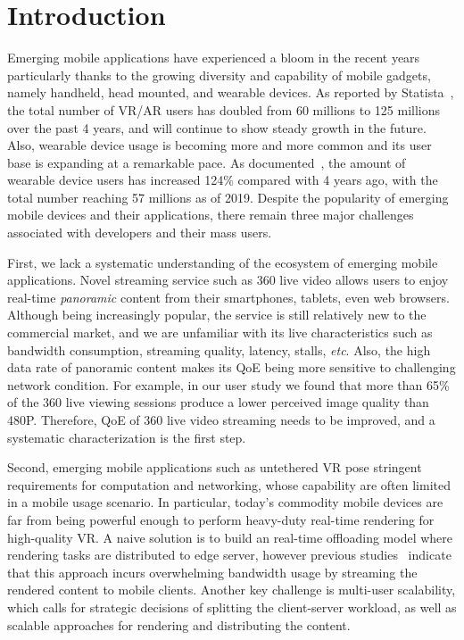 \chapter{Introduction} \label{chap:intro}

Emerging mobile applications have experienced a bloom in the recent years particularly thanks to the growing diversity and capability of mobile gadgets, namely handheld, head mounted, and wearable devices. As reported by Statista~\cite{VRARusers}, the total number of VR/AR users has doubled from 60 millions to 125 millions over the past 4 years, and will continue to show steady growth in the future. Also, wearable device usage is becoming more and more common and its user base is expanding at a remarkable pace. As documented~\cite{wearableusers}, the amount of wearable device users has increased 124\% compared with 4 years ago, with the total number reaching 57 millions as of 2019. Despite the popularity of emerging mobile devices and their applications, there remain three major challenges associated with developers and their mass users.

First, we lack a systematic understanding of the ecosystem of emerging mobile applications. Novel streaming service such as 360\degree{} live video allows users to enjoy real-time \emph{panoramic} content from their smartphones, tablets, even web browsers. Although being increasingly popular, the service is still relatively new to the commercial market, and we are unfamiliar with its live characteristics such as bandwidth consumption, streaming quality, latency, stalls, \emph{etc}. Also, the high data rate of panoramic content makes its QoE being more sensitive to challenging network condition. For example, in our user study we found that more than 65\% of the 360\degree{} live viewing sessions produce a lower perceived image quality than 480P. Therefore, QoE of 360\degree{} live video streaming needs to be improved, and a systematic characterization is the first step.

Second, emerging mobile applications such as untethered VR pose stringent requirements for computation and networking, whose capability are often limited in a mobile usage scenario. In particular, today's commodity mobile devices are far from being powerful enough to perform heavy-duty real-time rendering for high-quality VR. A naive solution is to build an real-time offloading model where rendering tasks are distributed to edge server, however previous studies~\cite{boos2016flashback,lai2019furion} indicate that this approach incurs overwhelming bandwidth usage by streaming the rendered content to mobile clients. Another key challenge is multi-user scalability, which calls for strategic decisions of splitting the client-server
workload, as well as scalable approaches for rendering and distributing
the content.

